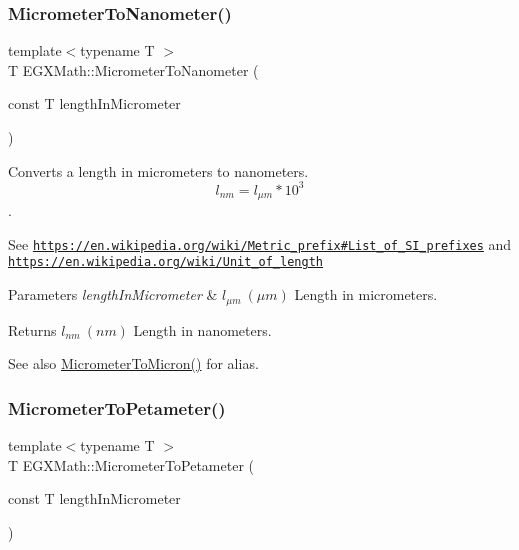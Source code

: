 \subsubsection{\texorpdfstring{Micrometer\+To\+Nanometer()}{MicrometerToNanometer()}}
{\footnotesize\ttfamily template$<$typename T $>$ \\
T E\+G\+X\+Math\+::\+Micrometer\+To\+Nanometer (\begin{DoxyParamCaption}\item[{const T}]{length\+In\+Micrometer }\end{DoxyParamCaption})}



Converts a length in micrometers to nanometers. \[ l_{nm}=l_{\mu m} * 10^{3} \]. 

See \href{https://en.wikipedia.org/wiki/Metric_prefix#List_of_SI_prefixes}{\tt https\+://en.\+wikipedia.\+org/wiki/\+Metric\+\_\+prefix\#\+List\+\_\+of\+\_\+\+S\+I\+\_\+prefixes} and \href{https://en.wikipedia.org/wiki/Unit_of_length}{\tt https\+://en.\+wikipedia.\+org/wiki/\+Unit\+\_\+of\+\_\+length} 
\begin{DoxyParams}{Parameters}
{\em length\+In\+Micrometer} & $ l_{\mu m}\ (\mu m)$ Length in micrometers. \\
\hline
\end{DoxyParams}
\begin{DoxyReturn}{Returns}
$ l_{nm}\ (nm)$ Length in nanometers. 
\end{DoxyReturn}
\begin{DoxySeeAlso}{See also}
\mbox{\hyperlink{group___e_g_x_math-_conversions-_length_conversions-_micrometer-_non-_s_i_ga5dc2a5dba0313f6a71db082aff501329}{Micrometer\+To\+Micron()}} for alias. 
\end{DoxySeeAlso}
\mbox{\label{group___e_g_x_math-_conversions-_length_conversions-_micrometer-_s_i_gaf151d8277712dbb886992fdd357d1c9d}} 
\subsubsection{\texorpdfstring{Micrometer\+To\+Petameter()}{MicrometerToPetameter()}}
{\footnotesize\ttfamily template$<$typename T $>$ \\
T E\+G\+X\+Math\+::\+Micrometer\+To\+Petameter (\begin{DoxyParamCaption}\item[{const T}]{length\+In\+Micrometer }\end{DoxyParamCaption})}



